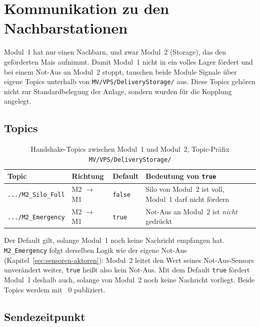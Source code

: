 \chapter{Kommunikation zu den Nachbarstationen}
\label{chap:kommunikation}


Modul~1 hat nur einen Nachbarn, und zwar Modul~2 (Storage), das den geförderten Mais
aufnimmt. Damit Modul~1 nicht in ein volles Lager fördert und bei einem Not-Aus an
Modul~2 stoppt, tauschen beide Module Signale über eigene Topics unterhalb von
\texttt{MV/VPS/DeliveryStorage/} aus. Diese Topics gehören nicht zur
Standardbelegung der Anlage, sondern wurden für die Kopplung angelegt.

\section{Topics}

\begin{table}[htbp]
  \centering
  \footnotesize
  \begin{tabularx}{\textwidth}{@{}l l l X@{}}
    \toprule
    \textbf{Topic} & \textbf{Richtung} & \textbf{Default} & \textbf{Bedeutung von \texttt{true}} \\
    \midrule
    \texttt{.../M2\_Silo\_Full}  & M2 $\rightarrow$ M1 & \texttt{false} & Silo von Modul~2 ist voll, Modul~1 darf nicht fördern \\
    \texttt{.../M2\_Emergency}   & M2 $\rightarrow$ M1 & \texttt{true}  & Not-Aus an Modul~2 ist \emph{nicht} gedrückt \\
    \bottomrule
  \end{tabularx}
  \caption[Handshake-Topics zwischen Modul~1 und Modul~2]{Handshake-Topics zwischen Modul~1 und Modul~2, Topic-Präfix \texttt{MV/VPS/DeliveryStorage/}}
  \label{tab:handshake}
\end{table}

Der Default gilt, solange Modul~1 noch keine Nachricht empfangen hat.
\texttt{M2\_Emergency} folgt derselben Logik wie der eigene Not-Aus
(Kapitel~\ref{sec:sensoren-aktoren}): Modul~2 leitet den Wert seines
Not-Aus-Sensors unverändert weiter, \texttt{true} heißt also \glqq kein Not-Aus\grqq.
Mit dem Default \texttt{true} fördert Modul~1 deshalb auch, solange von
Modul~2 noch keine Nachricht vorliegt. Beide Topics werdem mit ~0 publiziert.

\section{Sendezeitpunkt}

